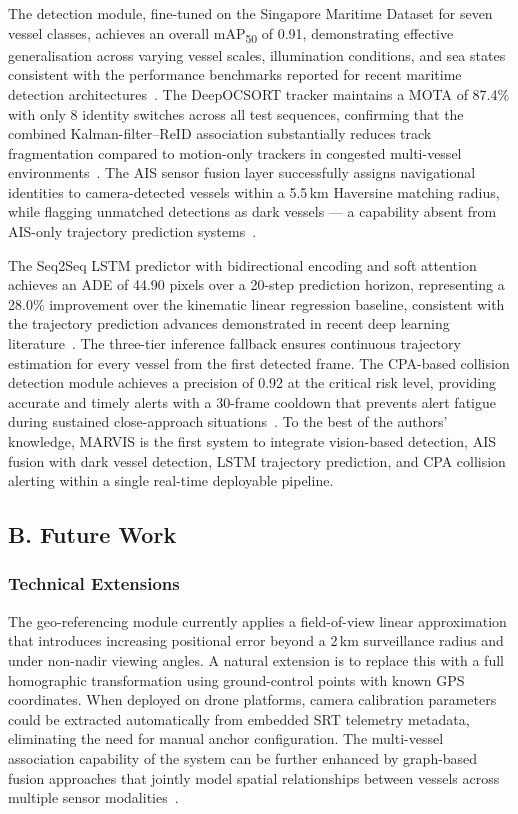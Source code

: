 \documentclass{ieeeaccess}
\begin{document}
The detection module, fine-tuned on the Singapore Maritime Dataset 
for seven vessel classes, achieves an overall mAP\textsubscript{50} 
of 0.91, demonstrating effective generalisation across varying vessel 
scales, illumination conditions, and sea states consistent with the 
performance benchmarks reported for recent maritime detection 
architectures~\cite{b3,b5,b18}. The DeepOCSORT tracker maintains a 
MOTA of 87.4\% with only 8 identity switches across all test 
sequences, confirming that the combined Kalman-filter--ReID 
association substantially reduces track fragmentation compared to 
motion-only trackers in congested multi-vessel 
environments~\cite{b9,b19}. The AIS sensor fusion layer successfully 
assigns navigational identities to camera-detected vessels within a 
5.5\,km Haversine matching radius, while flagging unmatched 
detections as dark vessels --- a capability absent from 
AIS-only trajectory prediction 
systems~\cite{b11,b20,b21,b22}.

The Seq2Seq LSTM predictor with bidirectional encoding and soft 
attention achieves an ADE of 44.90 pixels over a 20-step prediction 
horizon, representing a 28.0\% improvement over the kinematic linear 
regression baseline, consistent with the trajectory prediction 
advances demonstrated in recent deep learning 
literature~\cite{b23,b24,b25,b26}. The three-tier inference fallback 
ensures continuous trajectory estimation for every vessel from the 
first detected frame. The CPA-based collision detection module 
achieves a precision of 0.92 at the critical risk level, providing 
accurate and timely alerts with a 30-frame cooldown that prevents 
alert fatigue during sustained close-approach 
situations~\cite{b16,b27}. To the best of the authors' knowledge, 
MARVIS is the first system to integrate vision-based detection, AIS 
fusion with dark vessel detection, LSTM trajectory prediction, and 
CPA collision alerting within a single real-time deployable pipeline.

\subsection*{B. Future Work}

\subsubsection*{Technical Extensions}

The geo-referencing module currently applies a field-of-view linear 
approximation that introduces increasing positional error beyond a 
2\,km surveillance radius and under non-nadir viewing angles. A 
natural extension is to replace this with a full homographic 
transformation using ground-control points with known GPS 
coordinates. When deployed on drone platforms, camera calibration 
parameters could be extracted automatically from embedded SRT 
telemetry metadata, eliminating the need for manual anchor 
configuration. The multi-vessel association capability of the system 
can be further enhanced by graph-based fusion approaches that 
jointly model spatial relationships between vessels across multiple 
sensor modalities~\cite{b28}.
\end{document}
